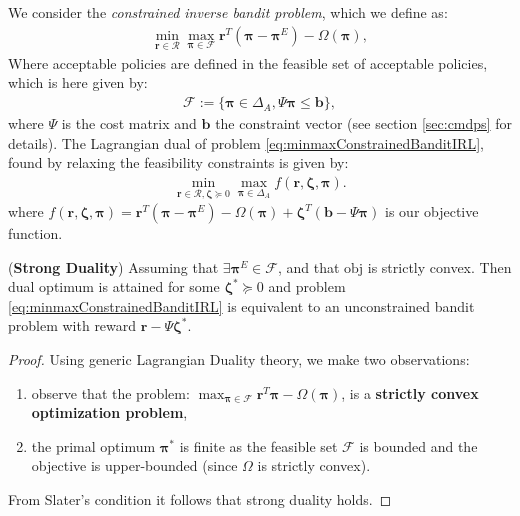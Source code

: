 We consider the \textit{constrained inverse bandit problem}, which we define as:
\begin{equation}
    \label{eq:minmaxConstrainedBanditIRL}
    \begin{aligned}
        \min_{\bm{r}\in\mathcal{R}}\max_{\bm{\pi}\in\mathcal{F}} \bm{r}^T(\bm{\pi}-\bm{\pi}^E)-\Omega(\bm{\pi}),
    \end{aligned}
\end{equation}
Where acceptable policies are defined in the feasible set of acceptable policies, which is here given by:
\begin{align*}
    \mathcal{F} := \big\lbrace \bm{\pi} \in \Delta_A, \Psi \bm{\pi} \leq \bm{b} \big\rbrace,
\end{align*}
where $\Psi$ is the cost matrix and $\bm{b}$ the constraint vector (see section \ref{sec:cmdps} for details). The Lagrangian dual of problem \ref{eq:minmaxConstrainedBanditIRL}, found by relaxing the feasibility constraints is given by:
\begin{equation}
    \label{eq:dualConstrainedBanditIRL}
    \begin{aligned}
        \min_{\bm{r}\in\mathcal{R},\bm{\zeta} \succcurlyeq 0}\max_{\bm{\pi}\in\Delta_{A}} f(\bm{r},\bm{\zeta},\bm{\pi}).
    \end{aligned}
\end{equation}
where $f(\bm{r},\bm{\zeta},\bm{\pi}) = \bm{r}^T(\bm{\pi}-\bm{\pi}^E)-\Omega(\bm{\pi}) + \bm{\zeta}^T (\bm{b}-\Psi \bm{\pi})$ is our objective function.
\begin{proposition}
    \label{prop:bandit_strong_duality}
    (\textbf{Strong Duality}) Assuming that $\exists \bm{\pi}^E\in\mathcal{F}$, and that $\text{obj}$ is strictly convex. Then dual optimum is attained for some $\bm{\zeta}^* \succcurlyeq 0$ and problem \ref{eq:minmaxConstrainedBanditIRL} is equivalent to an unconstrained bandit problem with reward $\bm{r}-\Psi \bm{\zeta}^*$. 
\end{proposition}
\begin{proof}
    Using generic Lagrangian Duality theory, we make two observations:
    \begin{enumerate}
        \item observe that the problem: $\max_{\bm{\pi} \in \mathcal{F}} \bm{r}^T \bm{\pi} - \Omega(\bm{\pi})$, is a \textbf{strictly convex optimization problem},
        \item the primal optimum $\bm{\pi}^*$ is finite as the feasible set $\mathcal{F}$ is bounded and the objective is upper-bounded (since $\Omega$ is strictly convex).
    \end{enumerate}
    From Slater's condition it follows that strong duality holds.
\end{proof}
